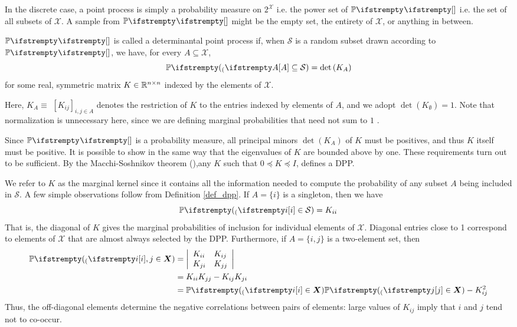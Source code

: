 In the discrete case, a point process is simply a probability measure on $2^{\mathcal X}$ i.e. the power set of $\PP{}{}$ i.e. the set of all subsets of $\mathcal{X}$. A sample from $\PP{}{}$ might be the empty set, the entirety of $\mathcal{X}$, or anything in between. 
\begin{definition}
    \label{def_dpp}
    $\PP{}{}$ is called a determinantal point process if, when $\mathcal{S}$ is a random subset drawn according to $\PP{}{}$, we have, for every $A \subseteq \mathcal{X}$,
    \begin{equation}
        \PP(A \subseteq \mathcal{S})=\operatorname{det}\left(K_A\right)
    \end{equation}
    for some real, symmetric matrix $K \in \mathbb{R}^{n \times n}$ indexed by the elements of $\mathcal{X}$.
\end{definition}
Here, $K_A \equiv$ $\left[K_{i j}\right]_{i, j \in A}$ denotes the restriction of $K$ to the entries indexed by elements of $A$, and we adopt $\operatorname{det}\left(K_\emptyset\right)=1$. Note that normalization is unnecessary here, since we are defining marginal probabilities that need not sum to $1$ .

Since $\PP{}{}$ is a probability measure, all principal minors $\operatorname{det}\left(K_A\right)$ of $K$ must be positives, and thus $K$ itself must be positive. It is possible to show in the same way that the eigenvalues of $K$ are bounded above by one. These requirements turn out to be sufficient. By the Macchi-Soshnikov theorem (\cite{macchi1975dpp}),any $K$ such that $0 \preceq K \preceq I$, defines a DPP.

We refer to $K$ as the marginal kernel since it contains all the information needed to compute the probability of any subset $A$ being included in $\mathcal{S}$. A few simple observations follow from Definition \ref{def_dpp}. If $A=\{i\}$ is a singleton, then we have
\begin{equation*}
	\PP(i \in \mathcal{S})=K_{i i}
\end{equation*}
That is, the diagonal of $K$ gives the marginal probabilities of inclusion for individual elements of $\mathcal{X}$. Diagonal entries close to 1 correspond to elements of $\mathcal{X}$ that are almost always selected by the DPP. Furthermore, if $A=\{i, j\}$ is a two-element set, then
\begin{equation}
    \label{eqn_paircorrel}
	\begin{aligned}
        \PP(i, j \in \boldsymbol{X}) &=\left|\begin{array}{ll}
	K_{i i} & K_{i j} \\
	K_{j i} & K_{j j}
	\end{array}\right| \\
	&=K_{i i} K_{j j}-K_{i j} K_{j i} \\
	&=\PP(i \in \boldsymbol{X}) \PP(j \in \boldsymbol{X})-K_{i j}^2
	\end{aligned}
\end{equation}
Thus, the off-diagonal elements determine the negative correlations between pairs of elements: large values of $K_{i j}$ imply that $i$ and $j$ tend not to co-occur.

